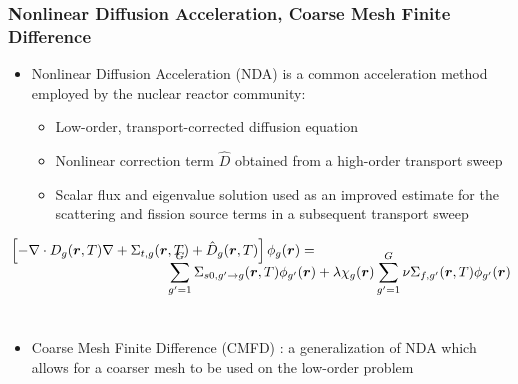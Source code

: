 \begin{frame}
    \frametitle{Nonlinear Diffusion Acceleration, Coarse Mesh Finite Difference}
    \begin{itemize}
        \item Nonlinear Diffusion Acceleration (NDA) is a common acceleration method employed by the nuclear reactor community:
            \begin{itemize}
                \item Low-order, transport-corrected diffusion equation
                \vspace{-0.5em}
                \item Nonlinear correction term $\hat{D}$ obtained from a high-order transport sweep
                \vspace{-0.5em}
			    \item Scalar flux and eigenvalue solution used as an improved estimate for the scattering and fission source terms in a subsequent transport sweep
            \end{itemize}
    \end{itemize}
    \vspace{-0.25cm}
	\begin{equation}
	  \begin{aligned}
	    &\l[-\nabla \cdot D_g(\br,T) \nabla + \Sigma_{t,g}(\br,T)+\hat{D}_g(\br,T) \r] \phi_g(\br) =\\[-13pt]
	    &\hspace{4cm}\sumgp \Sigma_{s0,g' \to g} (\br,T) \phi_{g'}(\br) + \lambda \chi_g(\br) \sumgp \nu \Sigma_{f,g'}(\br,T) \phi_{g'}(\br) \end{aligned}\label{eqn:eig}
	\end{equation}\\[-1em]
	\begin{itemize}
	    \item Coarse Mesh Finite Difference (CMFD) : a generalization of NDA which allows for a coarser mesh to be used on the low-order problem
	\end{itemize}	
\end{frame}
